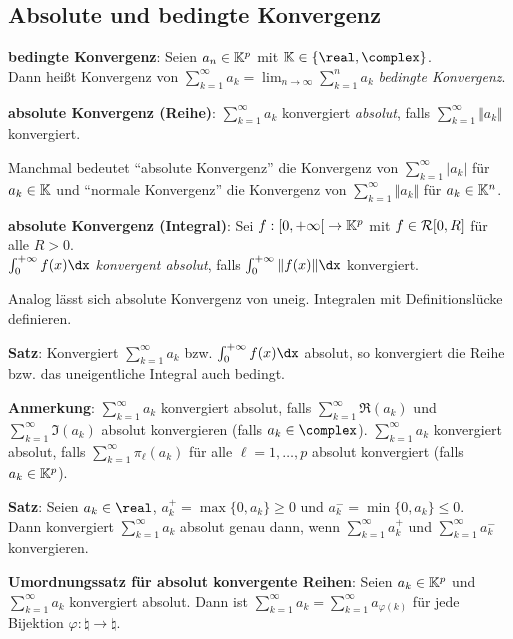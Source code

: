 \subsection{%
    Absolute und bedingte Konvergenz%
}

\textbf{bedingte Konvergenz}: Seien $a_n \in \mathbb{K}^p$ mit
$\field \in \{\real, \complex\}$. \\
Dann heißt Konvergenz von
$\sum_{k=1}^\infty a_k = \lim_{n \to \infty} \sum_{k=1}^n a_k$
\emph{bedingte Konvergenz}.

\textbf{absolute Konvergenz (Reihe)}:
$\sum_{k=1}^\infty a_k$ konvergiert \emph{absolut}, falls
$\sum_{k=1}^\infty \Vert a_k \Vert$ konvergiert.

Manchmal bedeutet "`absolute Konvergenz"' die Konvergenz von
$\sum_{k=1}^\infty |a_k|$ für $a_k \in \mathbb{K}$
und "`normale Konvergenz"' die Konvergenz von
$\sum_{k=1}^\infty \Vert a_k \Vert$ für $a_k \in \mathbb{K}^n$.

\textbf{absolute Konvergenz (Integral)}:
Sei $f: \left[0,+\infty\right[ \rightarrow \mathbb{K}^p$ mit $f \in \mathcal{R}[0,R]$
für alle $R > 0$. \\
$\int_0^{+\infty} f(x)\dx$ \emph{konvergent absolut}, falls
$\int_0^{+\infty} \Vert f(x) \Vert \dx$ konvergiert.

Analog lässt sich absolute Konvergenz von uneig. Integralen mit
Definitionslücke definieren.

\linie

\textbf{Satz}: Konvergiert $\sum_{k=1}^\infty a_k$ bzw.
$\int_0^{+\infty} f(x)\dx$ absolut, so konvergiert die Reihe bzw.
das uneigentliche Integral auch bedingt.

\textbf{Anmerkung}:
$\sum_{k=1}^\infty a_k$ konvergiert absolut, falls
$\sum_{k=1}^\infty \Re(a_k)$ und $\sum_{k=1}^\infty \Im(a_k)$ absolut
konvergieren (falls $a_k \in \complex$).
$\sum_{k=1}^\infty a_k$ konvergiert absolut, falls
$\sum_{k=1}^\infty \pi_\ell(a_k)$ für alle $\ell = 1, \dotsc, p$ absolut
konvergiert (falls $a_k \in \mathbb{K}^p$).

\linie

\textbf{Satz}:
Seien $a_k \in \real$, $a_k^+ = \max\{0, a_k\} \ge 0$ und
$a_k^- = \min\{0, a_k\} \le 0$. \\
Dann konvergiert $\sum_{k=1}^\infty a_k$ absolut genau dann, wenn
$\sum_{k=1}^\infty a_k^+$ und $\sum_{k=1}^\infty a_k^-$ konvergieren.

\textbf{Umordnungssatz für absolut konvergente Reihen}:
Seien $a_k \in \mathbb{K}^p$ und $\sum_{k=1}^\infty a_k$ konvergiert absolut.
Dann ist $\sum_{k=1}^\infty a_k = \sum_{k=1}^\infty a_{\varphi(k)}$
für jede Bijektion $\varphi: \natural \rightarrow \natural$.

